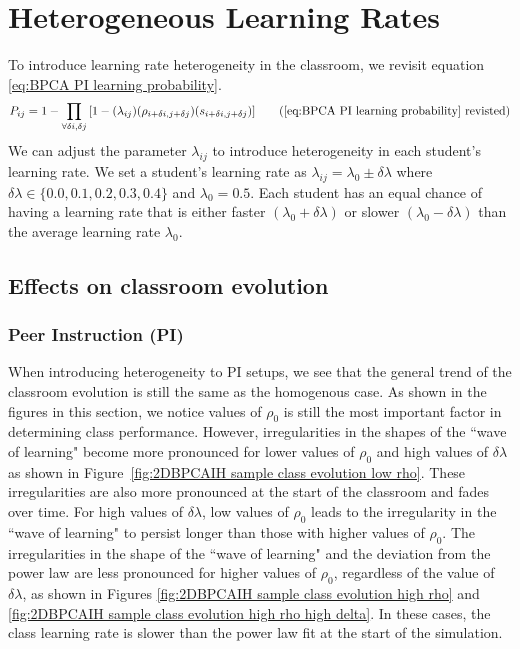 \chapter{Heterogeneous Learning Rates}

To introduce learning rate heterogeneity in the classroom, we revisit equation \ref{eq:BPCA PI learning probability}. 
\begin{equation*}
    P_{ij} = 1 - \prod_{\forall \delta i, \delta j}{\lbrack1-(\lambda_{ij})(\rho_{i+\delta i, j+\delta j})(s_{i+\delta i, j+\delta j})}\rbrack
    \tag{\ref{eq:BPCA PI learning probability} revisted}
\end{equation*}
We can adjust the parameter $\lambda_{ij}$ to introduce heterogeneity in each student's learning rate. 
We set a student's learning rate as $\lambda_{ij} = \lambda_0 \pm \delta\lambda$ where $\delta\lambda \in \lbrace 0.0,0.1, 0.2, 0.3, 0.4\rbrace$ and $\lambda_0 = 0.5$. 
Each student has an equal chance of having a learning rate that is either faster $(\lambda_0 + \delta\lambda)$ or slower $(\lambda_0 - \delta\lambda)$ than the average learning rate $\lambda_0$.  

\section{Effects on classroom evolution}\label{sec:BPCAIH effects on classroom evolution}
\subsection{Peer Instruction (PI)}\label{sec:BPCAIH effects on classroom evolution PI}
When introducing heterogeneity to PI setups, we see that the general trend of the classroom evolution is still the same as the homogenous case.
As shown in the figures in this section, we notice values of $\rho_0$ is still the most important factor in determining class performance. 
However, irregularities in the shapes of the ``wave of learning" become more pronounced for lower values of $\rho_0$ and high values of $\delta\lambda$ as shown in Figure~\ref{fig:2DBPCAIH sample class evolution low rho}.
These irregularities are also more pronounced at the start of the classroom and fades over time.
For high values of $\delta\lambda$, low values of $\rho_0$ leads to the irregularity in the ``wave of learning" to persist longer than those with higher values of $\rho_0$.
The irregularities in the shape of the ``wave of learning" and the deviation from the power law are less pronounced for higher values of $\rho_0$, regardless of the value of $\delta\lambda$, as shown in Figures \ref{fig:2DBPCAIH sample class evolution high rho} and \ref{fig:2DBPCAIH sample class evolution high rho high delta}.
In these cases, the class learning rate is slower than the power law fit at the start of the simulation.

